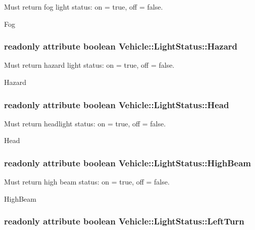 Must return fog light status\-: on = true, off = false. 

Fog \hypertarget{interfaceVehicle_1_1LightStatus_a588f593d003580e3208ea362e140f332}{
\subsubsection[{Hazard}]{\setlength{\rightskip}{0pt plus 5cm}readonly attribute boolean Vehicle\-::\-Light\-Status\-::\-Hazard}}\label{interfaceVehicle_1_1LightStatus_a588f593d003580e3208ea362e140f332}


Must return hazard light status\-: on = true, off = false. 

Hazard \hypertarget{interfaceVehicle_1_1LightStatus_a39343ff742b60d91613d8649bb86ebb7}{
\subsubsection[{Head}]{\setlength{\rightskip}{0pt plus 5cm}readonly attribute boolean Vehicle\-::\-Light\-Status\-::\-Head}}\label{interfaceVehicle_1_1LightStatus_a39343ff742b60d91613d8649bb86ebb7}


Must return headlight status\-: on = true, off = false. 

Head \hypertarget{interfaceVehicle_1_1LightStatus_a025992fe8ae85894b3042d882a3ee73e}{
\subsubsection[{High\-Beam}]{\setlength{\rightskip}{0pt plus 5cm}readonly attribute boolean Vehicle\-::\-Light\-Status\-::\-High\-Beam}}\label{interfaceVehicle_1_1LightStatus_a025992fe8ae85894b3042d882a3ee73e}


Must return high beam status\-: on = true, off = false. 

High\-Beam \hypertarget{interfaceVehicle_1_1LightStatus_a89443871ed46a45e98640ec1eaa327f8}{
\subsubsection[{Left\-Turn}]{\setlength{\rightskip}{0pt plus 5cm}readonly attribute boolean Vehicle\-::\-Light\-Status\-::\-Left\-Turn}}\label{interfaceVehicle_1_1LightStatus_a89443871ed46a45e98640ec1eaa327f8}


